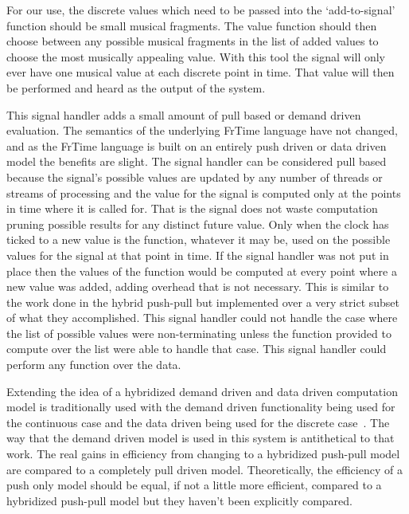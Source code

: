 \documentclass[12pt]{ucthesis}
\begin{document}
For our use, the discrete values which need to be passed into the `add-to-signal' function should be small musical fragments. The value function should then choose between any possible musical fragments in the list of added values to choose the most musically appealing value.  With this tool the signal will only ever have one musical value at each discrete point in time. That value will then be performed and heard as the output of the system. 

This signal handler adds a small amount of pull based or demand driven evaluation. The semantics of the underlying FrTime language have not changed, and as the FrTime language is built on an entirely push driven or data driven model the benefits are slight. The signal handler can be considered pull based because the signal's possible values are updated by any number of threads or streams of processing and the value for the signal is computed only at the points in time where it is called for. That is the signal does not waste computation pruning possible results for any distinct future value. Only when the clock has ticked to a new value is the function, whatever it may be, used on the possible values for the signal at that point in time. If the signal handler was not put in place then the values of the function would be computed at every point where a new value was added, adding overhead that is not necessary. This is similar to the work done in the hybrid push-pull but implemented over a very strict subset of what they accomplished. This signal handler could not handle the case where the list of possible values were non-terminating unless the function provided to compute over the list were able to handle that case. This signal handler could perform any function over the data. 



Extending the idea of a hybridized demand driven and data driven computation model is traditionally used with the demand driven functionality being used for the continuous case and the data driven being used for the discrete case~\cite{push-pull-frp}. The way that the demand driven model is used in this system is antithetical to that work. The real gains in efficiency from changing to a hybridized push-pull model are compared to a completely pull driven model. Theoretically, the efficiency of a push only model should be equal, if not a little more efficient, compared to a hybridized push-pull model but they haven't been explicitly compared.  
\end{document}
